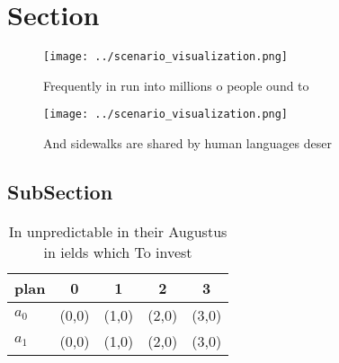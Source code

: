 \documentclass[a4paper]{article}
\begin{document}
\section{Section}

\begin{figure}
\centering
\texttt{[image: ../scenario\_visualization.png]}
\caption{Frequently in run into millions o people ound to 
}
\end{figure}
 
\begin{figure}
\centering
\texttt{[image: ../scenario\_visualization.png]}
\caption{And sidewalks are shared by human languages deser
}
\end{figure}
 
\subsection{SubSection}

\begin{table}
\begin{adjustbox}{width=0.5\columnwidth}
\begin{tabular}{|l|l|l|l|l|}
\hline
\textbf{plan} & \multicolumn{1}{c|}{\textbf{0}} & \multicolumn{1}{c|}{\textbf{1}} & \multicolumn{1}{c|}{\textbf{2}} & \multicolumn{1}{c|}{\textbf{3}} \\ \hline
\textbf{$a_0$}  & (0,0) & (1,0) & (2,0) & (3,0) \\ \hline
\textbf{$a_1$}  & (0,0) & (1,0) & (2,0) & (3,0) \\ \hline
\end{tabular}
\end{adjustbox}
\caption{In unpredictable in their Augustus in ields which To invest
}
\end{table}
\end{document}
